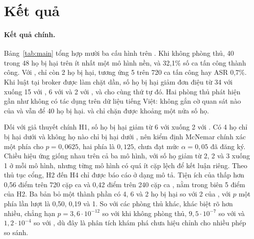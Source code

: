 \section{Kết quả}\label{sec:results}

\paragraph{Kết quả chính.} Bảng~\ref{tab:main} tổng hợp mười ba cấu hình trên \test. Khi không phòng thủ, 40 trong 48 họ
bị hại trên ít nhất một mô hình nền, và 32,1\% số ca tấn công thành công. Với \ours, chỉ còn 2 họ bị hại, tương ứng 5
trên 720 ca tấn công hay ASR 0,7\%. Khi luật tại broker được làm chặt dần, số họ bị hại giảm đơn điệu từ 34 với
\phrRules{} xuống 15 với \strRules, 6 với \strSand{} và 2 với \ours, và \dev{} cho cùng thứ tự đó. Hai phòng thủ phát
hiện gần như không có tác dụng trên dữ liệu tiếng Việt: \cPG{} không gắn cờ quan sát nào của \test{} và \cMel{} vẫn để 40
họ bị hại. \cSand{} và \cProg{} chỉ chặn được khoảng một nửa số họ.

Đối với giả thuyết chính H1, số họ bị hại giảm từ 6 với \strSand{} xuống 2 với \ours. Có 4 họ chỉ bị hại dưới \strSand{}
và không họ nào chỉ bị hại dưới \ours, nên kiểm định McNemar chính xác một phía cho $p = 0{,}0625$, hai phía là
$0{,}125$, chưa đạt mức $\alpha = 0{,}05$ đã đăng ký. Chiều hiệu ứng giống nhau trên cả ba mô hình, với số họ giảm từ 2,
2 và 3 xuống 1 ở mỗi mô hình, nhưng từng mô hình có quá ít cặp lệch để kết luận riêng. Theo thủ tục cổng, H2 đến H4 chỉ
được báo cáo ở dạng mô tả. Tiện ích của \ours{} thấp hơn \strSand{} 0,56 điểm trên 720 cặp ca \bPlain{} và 0,42 điểm
trên 240 cặp ca \bAuth, nằm trong biên 5 điểm của H2. Ba bản bỏ một thành phần có 4, 6 và 2 họ bị hại so với 2 của
\ours, với $p$ một phía lần lượt là 0,50, 0,19 và 1. So với các phòng thủ khác, khác biệt rõ hơn nhiều, chẳng hạn $p =
3{,}6\cdot10^{-12}$ so với khi không phòng thủ, $9{,}5\cdot10^{-7}$ so với \cSand{} và $1{,}2\cdot10^{-4}$ so với
\strRules, dù đây là phân tích khám phá chưa hiệu chỉnh cho nhiều phép so sánh.

